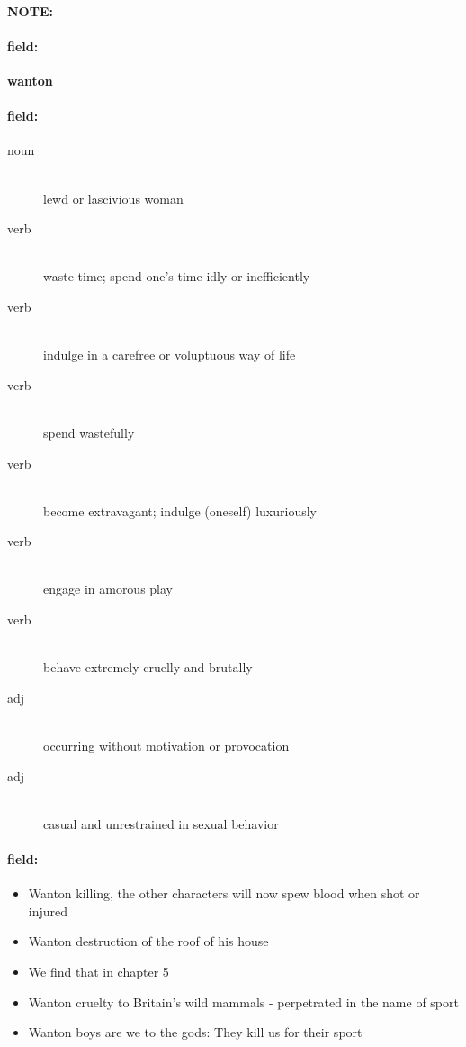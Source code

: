 \documentclass[12pt]{article}
\newenvironment{note}{\paragraph{NOTE:}}{}
\newenvironment{field}{\paragraph{field:}}{}
\begin{document}
\begin{note}
\begin{field}
\textbf{\large wanton}
\end{field}


\begin{field}
\begin{description}
\item[noun] \hfill \\ 
lewd or lascivious woman

\item[verb] \hfill \\ 
waste time; spend one's time idly or inefficiently

\item[verb] \hfill \\ 
indulge in a carefree or voluptuous way of life

\item[verb] \hfill \\ 
spend wastefully

\item[verb] \hfill \\ 
become extravagant; indulge (oneself) luxuriously

\item[verb] \hfill \\ 
engage in amorous play

\item[verb] \hfill \\ 
behave extremely cruelly and brutally

\item[adj] \hfill \\ 
occurring without motivation or provocation

\item[adj] \hfill \\ 
casual and unrestrained in sexual behavior

\end{description}
\end{field}

\begin{field}
\begin{itemize}
\item Wanton killing, the other characters will now spew blood when shot or injured
\item Wanton destruction of the roof of his house
\item We find that in chapter 5
\item Wanton cruelty to Britain's wild mammals - perpetrated in the name of sport
\item Wanton boys are we to the gods: They kill us for their sport
\end{itemize}
\end{field}
\end{note}
\end{document}
